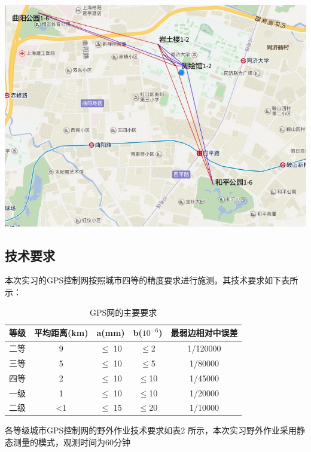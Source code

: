 \documentclass[a4paper,16pt,UTF8]{article}
\begin{document}
\begin{center}
    \includegraphics[scale = 0.8]{dadi.jpg}
\end{center}


\subsection{\Large 技术要求}
本次实习的GPS控制网按照城市四等的精度要求进行施测。其技术要求如下表所示：

\begin{center}
    \begin{longtable}{|c|c|c|c|c|}
        \caption{GPS网的主要要求} \\ \hline
        等级 & 平均距离(km) & a(mm) & b($10^{-6}$) & 最弱边相对中误差 \\ \hline
        二等    & 9 & $\leq$ 10    & $\leq$2     & 1/120000 \\ \hline
        三等    & 5 & $\leq$ 10    & $\leq$5     & 1/80000 \\ \hline
        四等    & 2 & $\leq$ 10    & $\leq$10    & 1/45000 \\ \hline
        一级    & 1 & $\leq$ 10    & $\leq$10    & 1/20000 \\ \hline
        二级    & <1& $\leq$ 15    & $\leq$20    & 1/10000 \\ \hline
    \end{longtable}
\end{center}

各等级城市GPS控制网的野外作业技术要求如表2 所示，本次实习野外作业采用静态测量的模式，观测时间为60分钟
\end{document}
